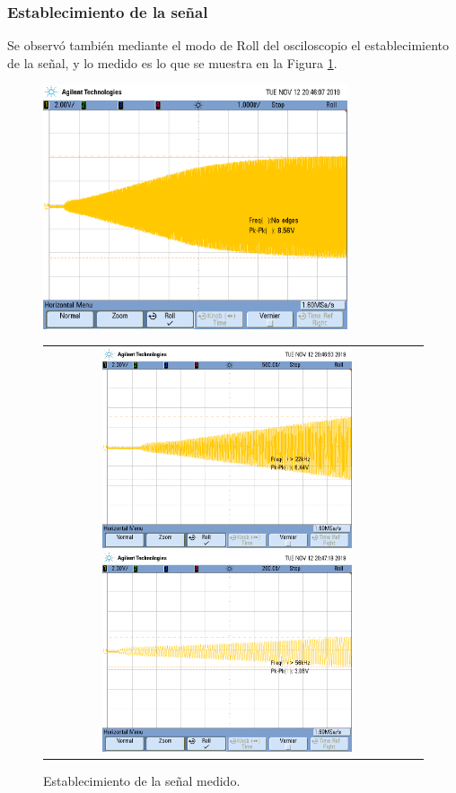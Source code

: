 \subsubsection{Establecimiento de la señal}
Se observó también mediante el modo de Roll del osciloscopio el establecimiento de la señal, y lo medido es lo que se muestra en la Figura \ref{fig:start_up_ex1}.
\begin{figure}[H]
    \centering
    \includegraphics[width=0.8\textwidth]{../EJ1/Recursos/start_up.png}
    \begin{tabular}{c c}
        \includegraphics[width=0.7\textwidth]{../EJ1/Recursos/start_up_zoom_x1.png}
        \includegraphics[width=0.7\textwidth]{../EJ1/Recursos/start_up_zoom_x2.png}
    \end{tabular}
    \caption{Establecimiento de la señal medido.}
    \label{fig:start_up_ex1}    
\end{figure}
